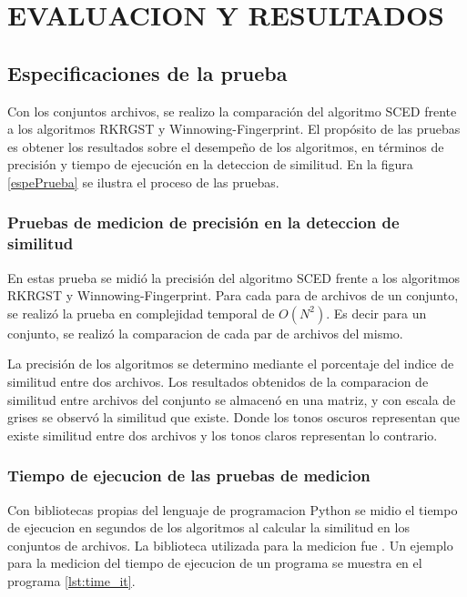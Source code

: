 \chapter{EVALUACION Y RESULTADOS}
\section{Especificaciones de la prueba}
Con los conjuntos archivos, se realizo la comparación del algoritmo SCED frente a los algoritmos RKRGST y Winnowing-Fingerprint. El propósito de las pruebas es obtener los resultados sobre el desempeño de los algoritmos, en términos de precisión y tiempo de ejecución en la deteccion de similitud. En la figura \ref{espePrueba} se ilustra el proceso de las pruebas.



\subsection{Pruebas de medicion de precisión en la deteccion de similitud}
En estas prueba se midió la precisión del algoritmo SCED frente a los algoritmos RKRGST y Winnowing-Fingerprint. Para cada para de archivos de un conjunto, se realizó la prueba en complejidad temporal de $O(N^2)$. Es decir para un conjunto, se realizó la comparacion de cada par de archivos del mismo.

La precisión de los algoritmos se determino mediante el porcentaje del indice de similitud entre dos archivos. Los resultados obtenidos de la comparacion de similitud entre archivos del conjunto se almacenó en una matriz, y con escala de grises se observó la similitud que existe. Donde los tonos oscuros representan que existe similitud entre dos archivos y los tonos claros representan lo contrario.

\subsection{Tiempo de ejecucion de las pruebas de medicion}
Con bibliotecas propias del lenguaje de programacion Python se midio el tiempo de ejecucion en segundos de los algoritmos al calcular la similitud en los conjuntos de archivos. La biblioteca utilizada para la medicion fue . Un ejemplo para la medicion del tiempo de ejecucion de un programa se muestra en el programa \ref{lst:time_it}.



